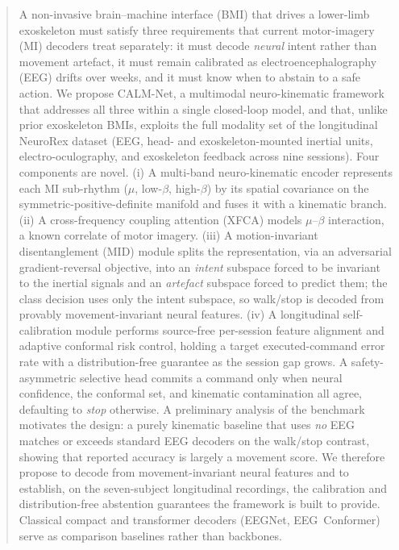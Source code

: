 \documentclass[journal]{IEEEtran}
\begin{document}
\begin{abstract}
A non-invasive brain--machine interface (BMI) that drives a lower-limb exoskeleton
must satisfy three requirements that current motor-imagery (MI) decoders treat
separately: it must decode \emph{neural} intent rather than movement artefact, it
must remain calibrated as electroencephalography (EEG) drifts over weeks, and it
must know when to abstain to a safe action. We propose CALM-Net, a multimodal
neuro-kinematic framework that addresses all three within a single closed-loop
model, and that, unlike prior exoskeleton BMIs, exploits the full modality set of
the longitudinal NeuroRex dataset (EEG, head- and exoskeleton-mounted inertial
units, electro-oculography, and exoskeleton feedback across nine sessions). Four
components are novel. (i) A multi-band neuro-kinematic encoder represents each MI
sub-rhythm ($\mu$, low-$\beta$, high-$\beta$) by its spatial covariance on the
symmetric-positive-definite manifold and fuses it with a kinematic branch. (ii) A
cross-frequency coupling attention (XFCA) models $\mu$--$\beta$ interaction, a known
correlate of motor imagery. (iii) A motion-invariant disentanglement (MID) module
splits the representation, via an adversarial gradient-reversal objective, into an
\emph{intent} subspace forced to be invariant to the inertial signals and an
\emph{artefact} subspace forced to predict them; the class decision uses only the
intent subspace, so walk/stop is decoded from provably movement-invariant neural
features. (iv) A longitudinal self-calibration module performs source-free
per-session feature alignment and adaptive conformal risk control, holding a target
executed-command error rate with a distribution-free guarantee as the session gap
grows. A safety-asymmetric selective head commits a command only when neural
confidence, the conformal set, and kinematic contamination all agree, defaulting to
\emph{stop} otherwise. A preliminary analysis of the benchmark motivates the design: a purely kinematic
baseline that uses \emph{no} EEG matches or exceeds standard EEG decoders on the
walk/stop contrast, showing that reported accuracy is largely a movement score. We
therefore propose to decode from movement-invariant neural features and to establish,
on the seven-subject longitudinal recordings, the calibration and distribution-free
abstention guarantees the framework is built to provide. Classical compact and
transformer decoders (EEGNet, EEG~Conformer) serve as comparison baselines rather
than backbones.
\end{abstract}
\end{document}
